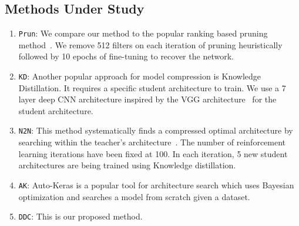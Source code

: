 \documentclass[../main]{subfiles}
\begin{document}


    \subsection{Methods Under Study}
        \label{sec:baselines}
        \begin{enumerate}
            \item   \texttt{Prun}: We compare our method to the popular ranking based pruning method~\cite{molchanov2016pruning}.
            We remove 512 filters on each iteration of pruning heuristically followed by 10 epochs of fine-tuning to recover the network.
            \item   \texttt{KD}: Another popular approach for model compression is Knowledge Distillation.
            It requires a specific student architecture to train.
            We use a 7 layer deep CNN architecture inspired by the VGG architecture~\cite{simonyan2014very} for the student architecture.
            \item   \texttt{N2N}: This method systematically finds a compressed optimal architecture by searching within the teacher's architecture~\cite{ashok2017n2n}.
            The number of reinforcement learning iterations have been fixed at 100.
            In each iteration, 5 new student architectures are being trained using Knowledge distillation.
            \item   \texttt{AK}: Auto-Keras \cite{jin2018efficient} is a popular tool for architecture search which uses Bayesian optimization and searches a model from scratch given a dataset.
            \item   \texttt{DDC}: This is our proposed method.
        \end{enumerate}
    
\end{document}
